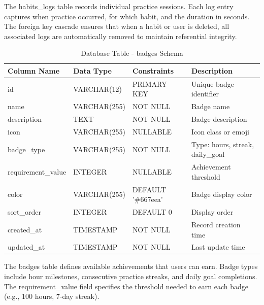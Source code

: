 \documentclass[12pt,a4paper]{report}
\newcommand{\JustifiedNormal}{\fontsize{12}{14}\selectfont\justifying\setlength{\parindent}{0pt}}
\begin{document}
\JustifiedNormal
The habits\_logs table records individual practice sessions. Each log entry captures when practice occurred, for which habit, and the duration in seconds. The foreign key cascade ensures that when a habit or user is deleted, all associated logs are automatically removed to maintain referential integrity.

\begin{table}[H]
\centering
\caption{Database Table - badges Schema}
\small
\begin{tabular}{|p{3.5cm}|p{3cm}|p{3cm}|p{4cm}|}
\hline
\textbf{Column Name} & \textbf{Data Type} & \textbf{Constraints} & \textbf{Description} \\
\hline
id & VARCHAR(12) & PRIMARY KEY & Unique badge identifier \\
\hline
name & VARCHAR(255) & NOT NULL & Badge name \\
\hline
description & TEXT & NOT NULL & Badge description \\
\hline
icon & VARCHAR(255) & NULLABLE & Icon class or emoji \\
\hline
badge\_type & VARCHAR(255) & NOT NULL & Type: hours, streak, daily\_goal \\
\hline
requirement\_value & INTEGER & NULLABLE & Achievement threshold \\
\hline
color & VARCHAR(255) & DEFAULT '\#667eea' & Badge display color \\
\hline
sort\_order & INTEGER & DEFAULT 0 & Display order \\
\hline
created\_at & TIMESTAMP & NOT NULL & Record creation time \\
\hline
updated\_at & TIMESTAMP & NOT NULL & Last update time \\
\hline
\end{tabular}
\end{table}

\JustifiedNormal
The badges table defines available achievements that users can earn. Badge types include hour milestones, consecutive practice streaks, and daily goal completions. The requirement\_value field specifies the threshold needed to earn each badge (e.g., 100 hours, 7-day streak).
\end{document}
